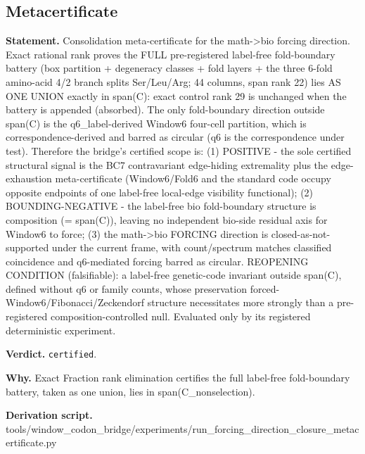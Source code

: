 \subsection{Metacertificate}\label{sec:bridge-metacertificate}
\textbf{Statement.} Consolidation meta-certificate for the math->bio forcing direction. Exact rational rank proves the
FULL pre-registered label-free fold-boundary battery (box partition + degeneracy classes + fold
layers + the three 6-fold amino-acid 4/2 branch splits Ser/Leu/Arg; 44 columns, span rank 22) lies
AS ONE UNION exactly in span(C): exact control rank 29 is unchanged when the battery is appended
(absorbed). The only fold-boundary direction outside span(C) is the q6\_label-derived Window6
four-cell partition, which is correspondence-derived and barred as circular (q6 is the
correspondence under test). Therefore the bridge's certified scope is: (1) POSITIVE - the sole
certified structural signal is the BC7 contravariant edge-hiding extremality plus the
edge-exhaustion meta-certificate (Window6/Fold6 and the standard code occupy opposite endpoints of
one label-free local-edge visibility functional); (2) BOUNDING-NEGATIVE - the label-free bio
fold-boundary structure is composition (= span(C)), leaving no independent bio-side residual axis
for Window6 to force; (3) the math->bio FORCING direction is closed-as-not-supported under the
current frame, with count/spectrum matches classified coincidence and q6-mediated forcing barred as
circular. REOPENING CONDITION (falsifiable): a label-free genetic-code invariant outside span(C),
defined without q6 or family counts, whose preservation forced-Window6/Fibonacci/Zeckendorf
structure necessitates more strongly than a pre-registered composition-controlled null. Evaluated
only by its registered deterministic experiment.

\textbf{Verdict.} \texttt{certified}.

\textbf{Why.} Exact Fraction rank elimination certifies the full label-free fold-boundary battery, taken as one
union, lies in span(C\_nonselection).

\textbf{Derivation script.} tools/window\_codon\_bridge/experiments/run\_forcing\_direction\_closure\_metacertificate.py


